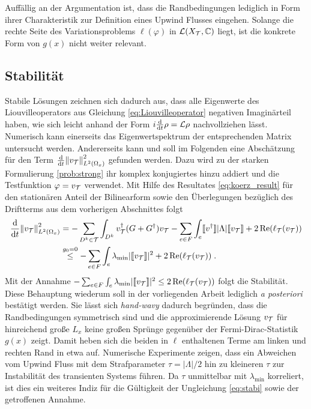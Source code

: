 Auffällig an der Argumentation ist, dass die Randbedingungen lediglich in Form ihrer Charakteristik zur Definition eines Upwind Flusses eingehen. Solange die rechte Seite des Variationsproblems $\ell(\varphi)$ in $\mathcal{L}(X_{\mathcal{T}},\mathbb{C})$ liegt, ist die konkrete Form von $g(x)$ nicht weiter relevant.

\subsection{Stabilität}\label{sec:stabilität}
Stabile Lösungen zeichnen sich dadurch aus, dass alle Eigenwerte des Liouvilleoperators aus Gleichung \eqref{eq:Liouvilleoperator} negativen Imaginärteil haben, wie sich leicht anhand der Form $i\frac{\mathrm{d}}{\mathrm{d}t}\rho = \mathcal{L}\rho$ nachvollziehen lässt. Numerisch kann einerseits das Eigenwertspektrum der entsprechenden Matrix untersucht werden. Andererseits kann und soll im Folgenden eine Abschätzung für den Term $\frac{\mathrm{d}}{\mathrm{d}t}\norm{v_{\mathcal{T}}}_{L^2(\Omega_x)}^2$ gefunden werden. Dazu wird zu der starken Formulierung \ref{prob:strong} ihr komplex konjugiertes hinzu addiert und die Testfunktion $\varphi=v_{\mathcal{T}}$ verwendet. Mit Hilfe des Resultates \eqref{eq:koerz_result} für den stationären Anteil der Bilinearform sowie den Überlegungen bezüglich des Driftterms aus dem vorherigen Abschnittes folgt
\begin{align}
  \frac{\mathrm{d}}{\mathrm{d}t}\norm{v_{\mathcal{T}}}_{L^2(\Omega_x)}^2
  &= - \sum_{D^k \in \mathcal{T}} \int_{D^k} v_{\mathcal{T}}^{\dagger}(G+G^{\dagger})v_{\mathcal{T}}
  - \sum_{e\in F}\int_e  \llbracket v^{\dagger} \rrbracket |\Lambda| \llbracket v_{\mathcal{T}} \rrbracket
  + 2\operatorname{Re}(\ell_{\mathcal{T}}(v_{\mathcal{T}})) \nonumber \\
 &\stackrel{g_0=0}{\leq} -  \sum_{e\in F}\int_e \lambda_{\text{min}}  |\llbracket v_{\mathcal{T}} \rrbracket|^2
       + 2\operatorname{Re}(\ell_{\mathcal{T}}(v_{\mathcal{T}})) \label{eq:stabi} \; .
\end{align}
Mit der Annahme $-  \sum_{e\in F}\int_e \lambda_{\text{min}}  |\llbracket v_{\mathcal{T}} \rrbracket|^2  \leq 2\operatorname{Re}(\ell_{\mathcal{T}}(v_{\mathcal{T}}))$ folgt die Stabilität. Diese Behauptung wiederum soll in der vorliegenden Arbeit lediglich \emph{a posteriori} bestätigt werden. Sie lässt sich \emph{hand-wavy} dadurch begründen, dass die Randbedingungen symmetrisch sind und die approximierende Lösung $v_{\mathcal{T}}$ für hinreichend große $L_x$ keine großen Sprünge gegenüber der Fermi-Dirac-Statistik $g(x)$ zeigt. Damit heben sich die beiden in $\ell$ enthaltenen Terme am linken und rechten Rand in etwa auf.
Numerische Experimente zeigen, dass ein Abweichen vom Upwind Fluss mit dem Strafparameter $\tau=|\Lambda|/2$ hin zu kleineren $\tau$ zur Instabilität des transienten Systems führen. Da $\tau$ unmittelbar mit $\lambda_{\text{min}}$ korreliert, ist dies ein weiteres Indiz für die Gültigkeit der Ungleichung \eqref{eq:stabi} sowie der getroffenen Annahme.

